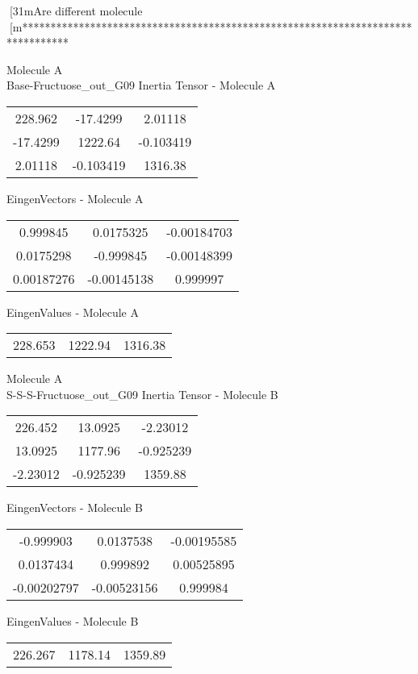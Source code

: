 [31mAre different molecule
[m********************************************************************************
\newpage
\begin{multicols}{2}
\begin{center}
Molecule A \\ 
Base-Fructuose_out_G09
Inertia Tensor - Molecule A \\
\vtab
\begin{tabular}{|c c c|}
228.962	 & 	-17.4299	 & 	2.01118	 \\
-17.4299	 & 	1222.64	 & 	-0.103419	 \\
2.01118	 & 	-0.103419	 & 	1316.38
\end{tabular}

\vtab
 EingenVectors - Molecule A     \\
\vtab
\begin{tabular}{|c c c|}
0.999845	 & 	0.0175325	 & 	-0.00184703	 \\
0.0175298	 & 	-0.999845	 & 	-0.00148399	 \\
0.00187276	 & 	-0.00145138	 & 	0.999997
\end{tabular}

\vtab
 EingenValues - Molecule A     \\
\vtab
\begin{tabular}{|c c c|}
228.653	 & 	1222.94	 & 	1316.38
\end{tabular}
\columnbreak
Molecule A \\ 
S-S-S-Fructuose_out_G09
Inertia Tensor - Molecule B \\
\vtab
\begin{tabular}{|c c c|}
226.452	 & 	13.0925	 & 	-2.23012	 \\
13.0925	 & 	1177.96	 & 	-0.925239	 \\
-2.23012	 & 	-0.925239	 & 	1359.88
\end{tabular}

\vtab
 EingenVectors - Molecule B     \\
\vtab
\begin{tabular}{|c c c|}
-0.999903	 & 	0.0137538	 & 	-0.00195585	 \\
0.0137434	 & 	0.999892	 & 	0.00525895	 \\
-0.00202797	 & 	-0.00523156	 & 	0.999984
\end{tabular}

\vtab
 EingenValues - Molecule B     \\
\vtab
\begin{tabular}{|c c c|}
226.267	 & 	1178.14	 & 	1359.89
\end{tabular}
\end{center}
\end{multicols}
